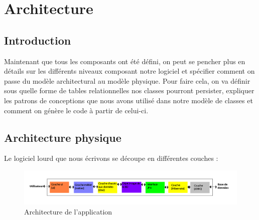 %
%
\chapter{Architecture}

\minitoc


\section*{Introduction}
Maintenant que tous les composants ont été défini, on peut se pencher plus en détails sur les différents niveaux composant notre logiciel et spécifier comment on passe du modèle architectural au modèle physique. Pour faire cela, on va définir sous quelle forme de tables relationnelles nos classes pourront persister, expliquer les patrons de conceptions que nous avons utilisé dans notre modèle de classes et comment on génère le code à partir de celui-ci.


\section{Architecture physique}

	
Le logiciel lourd que nous écrivons se découpe en différentes couches : 


\begin{figure}[htbp]

		\includegraphics[width=18cm]{images/ArchitecturePhysique.png}
	\caption{Architecture de l'application}
	\label{ArchitectureDeLApplication}
\end{figure}


